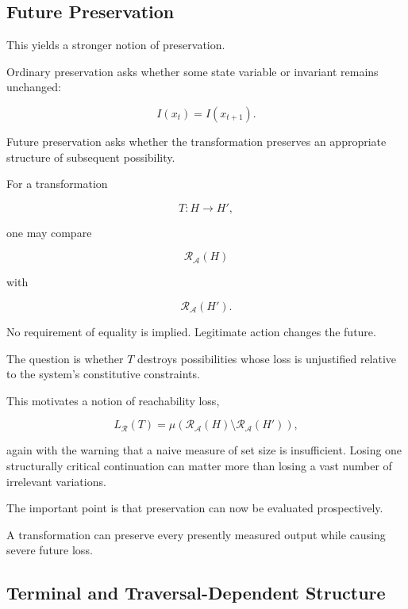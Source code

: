 \documentclass[11pt]{article}
\theoremstyle{remark}
\newcommand{\Adm}{\mathcal{A}}
\newcommand{\Reach}{\mathcal{R}}
\begin{document}
\subsection{Future Preservation}

This yields a stronger notion of preservation.

Ordinary preservation asks whether some state variable or invariant remains unchanged:

\begin{equation}
I(x_t)=I(x_{t+1}).
\end{equation}

Future preservation asks whether the transformation preserves an appropriate structure of subsequent possibility.

For a transformation

\begin{equation}
T:H\rightarrow H',
\end{equation}

one may compare

\begin{equation}
\Reach_{\Adm}(H)
\end{equation}

with

\begin{equation}
\Reach_{\Adm}(H').
\end{equation}

No requirement of equality is implied. Legitimate action changes the future.

The question is whether $T$ destroys possibilities whose loss is unjustified relative to the system's constitutive constraints.

This motivates a notion of reachability loss,

\begin{equation}
L_{\Reach}(T)
=
\mu
\left(
\Reach_{\Adm}(H)
\setminus
\Reach_{\Adm}(H')
\right),
\end{equation}

again with the warning that a naive measure of set size is insufficient. Losing one structurally critical continuation can matter more than losing a vast number of irrelevant variations.

The important point is that preservation can now be evaluated prospectively.

A transformation can preserve every presently measured output while causing severe future loss.

\subsection{Terminal and Traversal-Dependent Structure}
\end{document}
